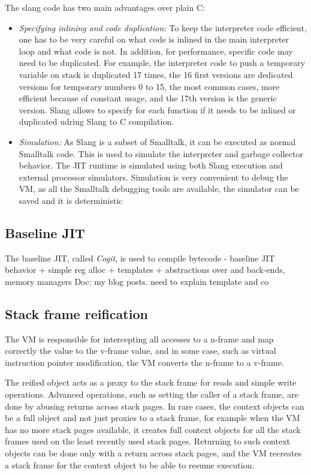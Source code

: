 \documentclass[a4paper,12pt,twoside]{../includes/ThesisStyle}
\begin{document}
The slang code has two main advantages over plain C:
\begin{itemize}
	\item \emph{Specifying inlining and code duplication:} To keep the interpreter code efficient, one has to be very careful on what code is inlined in the main interpreter loop and what code is not. In addition, for performance, specific code may need to be duplicated. For example, the interpreter code to push a temporary variable on stack is duplicated 17 times, the 16 first versions are dedicated versions for temporary numbers 0 to 15, the most common cases, more efficient because of constant usage, and the 17th version is the generic version. Slang allows to specify for each function if it needs to be inlined or duplicated udring Slang to C compilation.
	\item \emph{Simulation:} As Slang is a subset of Smalltalk, it can be executed as normal Smalltalk code. This is used to simulate the interpreter and garbage collector behavior. The JIT runtime is simulated using both Slang execution and external processor simulators. Simulation is very convenient to debug the VM, as all the Smalltalk debugging tools are available, the simulator can be saved and it is deterministic
\end{itemize}

\subsection{Baseline JIT}

The baseline JIT, called \emph{Cogit}, is used to compile bytecode
- baseline JIT behavior + simple reg alloc + templates + abstractions over and back-ends, memory managers
Doc: my blog posts. need to explain template and co

\subsection{Stack frame reification}


The VM is responsible for intercepting all accesses to a n-frame and map correctly the value to the v-frame value, and in some case, such as virtual instruction pointer modification, the VM converts the n-frame to a v-frame.


The reified object acts as a proxy to the stack frame for reads and simple write operations. Advanced operations, such as setting the caller of a stack frame, are done by abusing returns across stack pages. In rare cases, the context objects can be a full object and not just proxies to a stack frame, for example 
when the VM has no more stack pages available, it creates full context objects for all the stack frames used on the least recently used stack pages. Returning to such context objects can be done only with a return across stack pages, and the VM recreates a stack frame for the context object to be able to resume execution.
\end{document}
